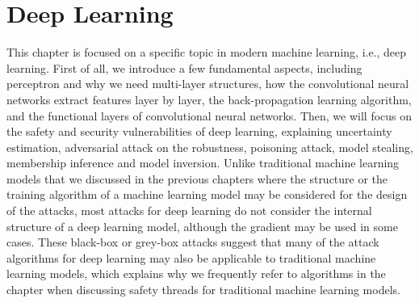 
\chapter{Deep Learning}\label{chap:deep}\label{part:deep}

This chapter is focused on a specific topic in modern machine learning, i.e., deep learning. First of all, we introduce a few fundamental aspects, including perceptron and why we need multi-layer structures, how the convolutional neural networks extract features layer by layer, the back-propagation learning algorithm, and the functional layers of convolutional neural networks. Then, we will focus on the safety and security vulnerabilities of deep learning, explaining uncertainty estimation, adversarial attack on the robustness, poisoning attack, model stealing, membership inference and model inversion. 
%
Unlike traditional machine learning models that we discussed in the previous chapters where the structure or the training algorithm of a machine learning model may be considered for the design of the attacks, most attacks  for deep learning do not consider the internal structure of a deep learning model, although the gradient may be used in some cases. These black-box or grey-box attacks suggest that many of the attack algorithms for deep learning may also be applicable to traditional machine learning models, which explains why we frequently refer to algorithms in the chapter when discussing safety threads for traditional machine learning models. 

















